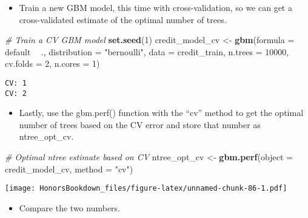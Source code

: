 \documentclass[
]{book}
\newenvironment{Shaded}{\begin{snugshade}}{\end{snugshade}}
\newcommand{\CommentTok}[1]{\textcolor[rgb]{0.56,0.35,0.01}{\textit{#1}}}
\newcommand{\DataTypeTok}[1]{\textcolor[rgb]{0.13,0.29,0.53}{#1}}
\newcommand{\DecValTok}[1]{\textcolor[rgb]{0.00,0.00,0.81}{#1}}
\newcommand{\KeywordTok}[1]{\textcolor[rgb]{0.13,0.29,0.53}{\textbf{#1}}}
\newcommand{\NormalTok}[1]{#1}
\newcommand{\OperatorTok}[1]{\textcolor[rgb]{0.81,0.36,0.00}{\textbf{#1}}}
\newcommand{\StringTok}[1]{\textcolor[rgb]{0.31,0.60,0.02}{#1}}
\providecommand{\tightlist}{%
  \setlength{\itemsep}{0pt}\setlength{\parskip}{0pt}}
\begin{document}
\begin{itemize}
\tightlist
\item
  Train a new GBM model, this time with cross-validation, so we can get a cross-validated estimate of the optimal number of trees.
\end{itemize}

\begin{Shaded}
\begin{Highlighting}[]
\CommentTok{# Train a CV GBM model}
\KeywordTok{set.seed}\NormalTok{(}\DecValTok{1}\NormalTok{)}
\NormalTok{credit_model_cv <-}\StringTok{ }\KeywordTok{gbm}\NormalTok{(}\DataTypeTok{formula =}\NormalTok{ default }\OperatorTok{~}\StringTok{ }\NormalTok{., }
                       \DataTypeTok{distribution =} \StringTok{"bernoulli"}\NormalTok{, }
                       \DataTypeTok{data =}\NormalTok{ credit_train,}
                       \DataTypeTok{n.trees =} \DecValTok{10000}\NormalTok{,}
                       \DataTypeTok{cv.folds =} \DecValTok{2}\NormalTok{,}
                       \DataTypeTok{n.cores =} \DecValTok{1}\NormalTok{)}
\end{Highlighting}
\end{Shaded}

\begin{verbatim}
CV: 1 
CV: 2 
\end{verbatim}

\begin{itemize}
\tightlist
\item
  Lastly, use the gbm.perf() function with the ``cv'' method to get the optimal number of trees based on the CV error and store that number as ntree\_opt\_cv.
\end{itemize}

\begin{Shaded}
\begin{Highlighting}[]
\CommentTok{# Optimal ntree estimate based on CV}
\NormalTok{ntree_opt_cv <-}\StringTok{ }\KeywordTok{gbm.perf}\NormalTok{(}\DataTypeTok{object =}\NormalTok{ credit_model_cv, }
                         \DataTypeTok{method =} \StringTok{"cv"}\NormalTok{)}
\end{Highlighting}
\end{Shaded}

\texttt{[image: HonorsBookdown\_files/figure-latex/unnamed-chunk-86-1.pdf]}

\begin{itemize}
\tightlist
\item
  Compare the two numbers.
\end{itemize}
\end{document}
